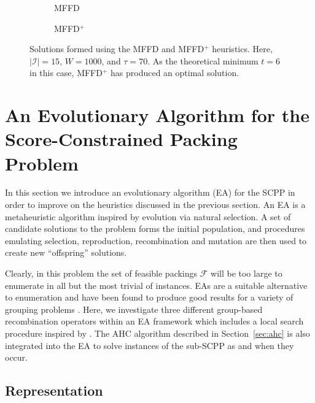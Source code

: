 \documentclass[a4paper,11pt,authoryear]{elsarticle}
\newcommand{\rev}[1]{{\color{myRed}#1}}
\begin{document}
\begin{figure}[h]	
	\centering
	\begin{subfigure}[h]{0.33\textwidth}
		
		\caption{MFFD}
		\label{fig:mffd}
	\end{subfigure} \hspace{15mm}
	\begin{subfigure}[h]{0.33\textwidth}
		
		\caption{MFFD$^+$}
		\label{fig:mffdplus}
	\end{subfigure}
	\caption{Solutions formed using the MFFD and MFFD$^+$ heuristics. Here, $|\mathcal{I}| = 15$, $W = 1000$, and $\tau = 70$. As the theoretical minimum $t=6$ in this case, MFFD$^+$ has produced an optimal solution.}
	\label{fig:mffdvsmffdplus}
\end{figure}

\section{An Evolutionary Algorithm for the Score-Constrained Packing Problem}
\label{sec:ea}

\noindent In this section we introduce an evolutionary algorithm (EA) for the SCPP in order to improve on the heuristics discussed in the previous section. An EA is a metaheuristic algorithm inspired by evolution via natural selection. A set of candidate solutions to the problem forms the initial population, and procedures emulating selection, reproduction, recombination and mutation are then used to create new ``offspring'' solutions. 

Clearly, in this problem the set of feasible packings $\mathcal{F}$ will be too large to enumerate in all but the most trivial of instances. EAs are a suitable alternative to enumeration and have been found to produce good results for a variety of grouping problems \citep{lewis2017, falkenauer1996, quiroz2015}. Here, we investigate three different group-based recombination operators within an EA framework which includes a local search procedure inspired by \cite{martello1990l}. The AHC algorithm described in Section~\ref{sec:ahc} is also integrated into the EA to solve instances of the sub-SCPP as and when they occur.

\subsection{\rev{Representation}}
\label{sub:representation}
\end{document}
